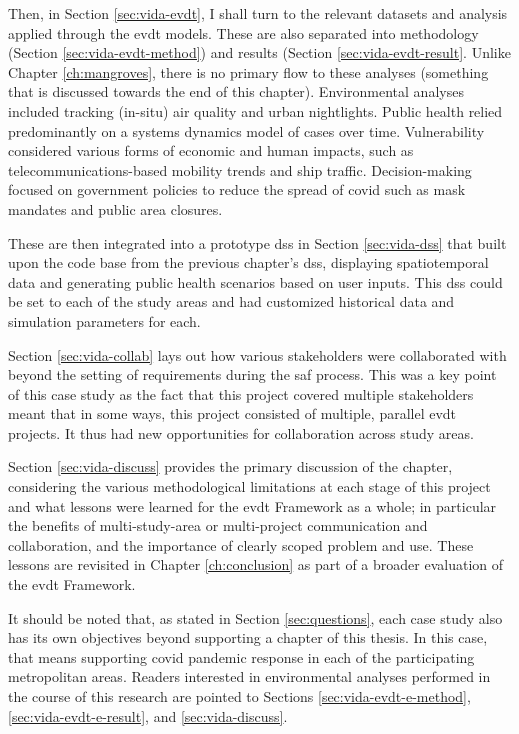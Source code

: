 Then, in Section \ref{sec:vida-evdt}, I shall turn to the relevant datasets and analysis applied through the \acf{evdt} models. These are also separated into methodology (Section \ref{sec:vida-evdt-method}) and results (Section \ref{sec:vida-evdt-result}. Unlike Chapter \ref{ch:mangroves}, there is no primary flow to these analyses (something that is discussed towards the end of this chapter). Environmental analyses included tracking (in-situ) air quality and urban nightlights. Public health relied predominantly on a systems dynamics model of cases over time. Vulnerability considered various forms of economic and human impacts, such as telecommunications-based mobility trends and ship traffic. Decision-making focused on government policies to reduce the spread of \ac{covid} such as mask mandates and public area closures.

These are then integrated into a prototype \ac{dss} in Section \ref{sec:vida-dss} that built upon the code base from the previous chapter's \ac{dss}, displaying spatiotemporal data and generating public health scenarios based on user inputs. This \ac{dss} could be set to each of the study areas and had customized historical data and simulation parameters for each.

Section \ref{sec:vida-collab} lays out how various stakeholders were collaborated with beyond the setting of requirements during the \ac{saf} process. This was a key point of this case study as the fact that this project covered multiple stakeholders meant that in some ways, this project consisted of multiple, parallel \ac{evdt} projects. It thus had new opportunities for collaboration across study areas.

Section \ref{sec:vida-discuss} provides the primary discussion of the chapter, considering the various methodological limitations at each stage of this project and what lessons were learned for the \ac{evdt} Framework as a whole; in particular the benefits of multi-study-area or multi-project communication and collaboration, and the importance of clearly scoped problem and use. These lessons are revisited in Chapter \ref{ch:conclusion} as part of a broader evaluation of the \ac{evdt} Framework.

It should be noted that, as stated in Section \ref{sec:questions}, each case study also has its own objectives beyond supporting a chapter of this thesis. In this case, that means supporting \ac{covid} pandemic response in each of the participating metropolitan areas. Readers interested in environmental analyses performed in the course of this research are pointed to Sections \ref{sec:vida-evdt-e-method}, \ref{sec:vida-evdt-e-result}, and \ref{sec:vida-discuss}.


